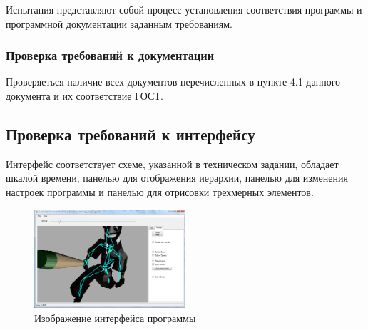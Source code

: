 Испытания представляют собой процесс установления соответствия программы и
программной документации заданным требованиям.

\subsubsection{Проверка требований к документации}
Проверяеться наличие всех документов перечисленных в пyнкте 4.1 данного документа и их соответствие ГОСТ.

\subsection{Проверка требований к интерфейсу}
Интерфейс соответствует схеме, указанной в техническом задании, обладает шкалой времени, панелью для отображения иерархии, панелью для изменения настроек программы и панелью для отрисовки трехмерных элементов.

\begin{figure}[h!]
    \centering
    \includegraphics[width=0.5\textwidth]{../screenshots/interface_map.png}
    \caption{Изображение интерфейса программы}
\end{figure}

